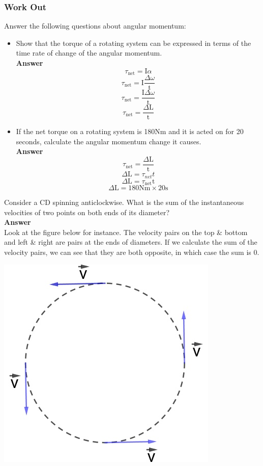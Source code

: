 \documentclass[13pt,addpoints]{exam}
\begin{document}
{{{\begin{questions}
					\subsubsection*{Work Out}
					\question Answer the following questions about angular momentum:
					\begin{itemize}
						\item Show that the torque of a rotating system can be expressed in terms of the time rate of change of the angular momentum. \\
						\textbf{Answer} \\
						$$\tau_\text{net}=\text{I}\alpha$$
						$$\tau_\text{net}=\text{I}\dfrac{\varDelta\omega}{\text{t}}$$
						$$\tau_\text{net}=\dfrac{\text{I}\varDelta\omega}{\text{t}}$$
						$$\tau_\text{net}=\dfrac{\varDelta\text{L}}{\text{t}}$$
						\item If the net torque on a rotating system is 180Nm and it is acted on for 20 seconds, calculate the angular momentum change it causes. \\
						\textbf{Answer} \\
						$$\tau_\text{net}=\dfrac{\varDelta\text{L}}{\text{t}}$$
						$$\varDelta\text{L}=\tau_{net}t$$
						$$\varDelta\text{L}=\tau_{\text{net}}\text{t}$$
						$$\varDelta\text{L}=180\text{Nm}\times20\text{s}$$
					\end{itemize}
					\question Consider a CD spinning anticlockwise. What is the sum of the instantaneous velocities of two points on both ends of its diameter? \\
					\textbf{Answer} \\
					Look at the figure below for instance. The velocity pairs on the top \& bottom and left \& right are pairs at the ends of diameters. If we calculate the sum of the velocity pairs, we can see that they are both opposite, in which case the sum is 0.
					\begin{center}
						\includegraphics[scale=0.4]{circle_inst}

\end{center}
\end{questions}}}}
\end{document}
